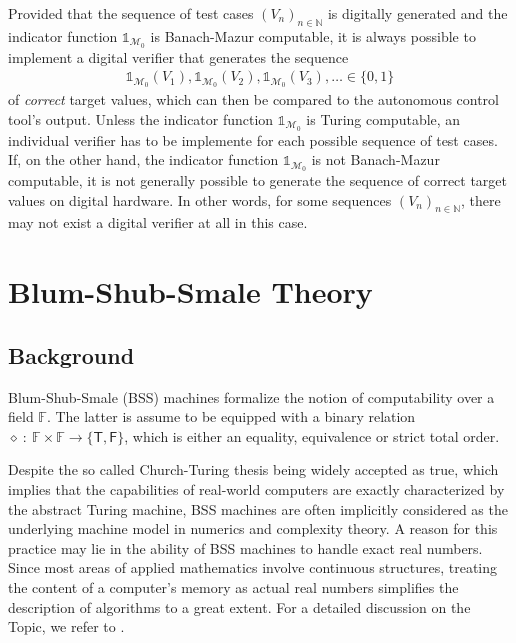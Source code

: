 \documentclass[conference]{IEEEtran}
\def\M{{\mathcal M}}
\def\NN{{\mathbb N}}
\def\RR{{\mathbb R}}
\def\FF{{\mathbb F}}
\newcommand{\revision}[1]{}
\begin{document}
	Provided that the sequence of test cases \((V_n)_{n\in\NN}\) is digitally generated and the indicator function \(\mathds{1}_{\M_0}\) is Banach-Mazur computable, 
	it is always possible to implement a digital verifier that generates the sequence 
	\begin{align} 	\mathds{1}_{\M_0}(V_1), \mathds{1}_{\M_0}(V_2), \mathds{1}_{\M_0}(V_3),\ldots	\in \{0,1\} 
	\end{align}
	of \emph{correct} target values,
	which can then be compared to the autonomous control tool's output. Unless the indicator function \(\mathds{1}_{\M_0}\) is Turing computable, an individual verifier has to be implemente for each 
	possible sequence of test cases. If, on the other hand, the indicator function \(\mathds{1}_{\M_0}\) is not Banach-Mazur computable, it is not generally possible to generate the 
	sequence of correct target values on digital hardware. In other words, for some sequences \((V_n)_{n\in\NN}\), there may not exist a digital verifier at all in this case.

\section{Blum-Shub-Smale Theory}	\label{sec:PreliminariesBSS}

	\subsection{Background}
	\revision{Despite the fact that the capabilities real-world, digital computers are 
	entirely captured by Turing machines, BSS machines over \(\RR\) are regularly considered in numerics and computational complexity theory. 
	This practice is justified by the premise that the error emerging from representing real numbers by floating point approximations is neglectible in all practically relevant numerical problems. 
	Furthermore, assumptions on the underlying machine model are usually implicit in numerics. In contrast, we seek to explicitly treat the underlying machine model in our investigations.}
			
	Blum-Shub-Smale (BSS) machines formalize the notion of computability over a field \(\FF\). The latter is assume to be equipped 
	with a binary relation \(\diamond~{:}~\FF \times \FF \rightarrow \{\mathsf{T},\mathsf{F}\}\), which is either an equality, equivalence or strict total order. 
	
	Despite the so called Church-Turing thesis being widely accepted as true, which implies that the capabilities of real-world computers are exactly characterized 
	by the abstract Turing machine, BSS machines are often implicitly considered as the underlying machine model in numerics and complexity theory. 
	A reason for this practice may lie in the ability of BSS machines to handle exact real numbers. Since most areas of applied mathematics involve continuous structures, 
	treating the content of a computer's memory as actual real numbers simplifies the description of algorithms to a great extent. For a detailed discussion on the Topic, we refer to \cite{Bl04}.
\end{document}
